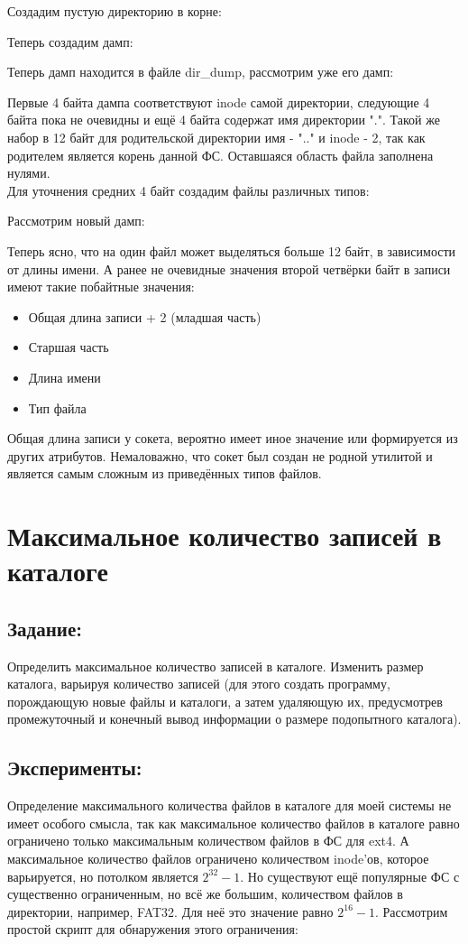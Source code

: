 \documentclass[a4paper]{article}
\begin{document}
\noindent Создадим пустую директорию в корне:

Теперь создадим дамп:

Теперь дамп находится в файле dir\_dump, рассмотрим уже его дамп:

Первые 4 байта дампа соответствуют inode самой директории, следующие 4 байта пока не очевидны и ещё 4 байта содержат имя директории ".". Такой же набор в 12 байт для родительской директории имя - ".." и inode - 2, так как родителем является корень данной ФС. Оставшаяся область файла заполнена нулями.\\
Для уточнения средних 4 байт создадим файлы различных типов:

Рассмотрим новый дамп:

Теперь ясно, что на один файл может выделяться больше 12 байт, в зависимости от длины имени. А ранее не очевидные значения второй четвёрки байт в записи имеют такие побайтные значения:
\begin{itemize}
\item Общая длина записи + 2 (младшая часть)
\item Старшая часть
\item Длина имени
\item Тип файла
\end{itemize}
Общая длина записи у сокета, вероятно имеет иное значение или формируется из других атрибутов. Немаловажно, что сокет был создан не родной утилитой и является самым сложным из приведённых типов файлов.

\section{Максимальное количество записей в каталоге}
\subsection{Задание:} Определить максимальное количество записей в каталоге. 
Изменить размер каталога, варьируя количество записей (для этого создать программу, порождающую новые файлы и каталоги, а затем удаляющую их, предусмотрев промежуточный и конечный вывод информации о размере подопытного каталога). 

\subsection{Эксперименты:}
Определение максимального количества файлов в каталоге для моей системы не имеет особого смысла, так как максимальное количество файлов в каталоге равно ограничено только максимальным количеством файлов в ФС для ext4. А максимальное количество файлов ограничено количеством inode'ов, которое варьируется, но потолком является $2^{32}-1$. Но существуют ещё популярные ФС с существенно ограниченным, но всё же большим, количеством файлов в директории, например, FAT32. Для неё это значение равно $2^{16}-1$. Рассмотрим простой скрипт для обнаружения этого ограничения:
\end{document}
